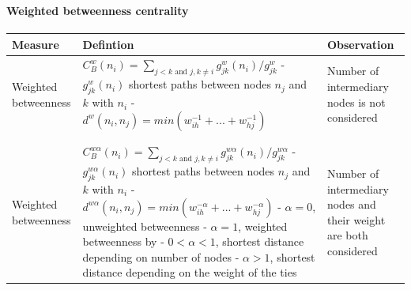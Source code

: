\documentclass[8pt]{beamer}
\begin{document}
\begin{frame}
\frametitle{\insertsection}
\framesubtitle{Weighted betweenness centrality	}
\scriptsize
\begin{table}
\begin{tabular}{p{2cm}p{6.5cm}p{2cm}}
\toprule
\textbf{Measure} & \textbf{Defintion} & \textbf{Observation}\\
\midrule
Weighted \newline betweenness\newline\cite{Brandes2008}&
$C_B^w(n_i) = \sum_{j<k \text{ and } j,k \neq i}g_{jk}^w(n_i)/g_{jk}^w$\newline
\newline
\newline
- $g_{jk}^w(n_i)$ shortest paths between nodes $n_j$ and $k$ with $n_i$ \newline
- $d^w(n_i, n_j) = min(w_{ih}^{-1}+ ... + w_{hj}^{-1})$&
Number of intermediary nodes is not considered\\
\\
\hline
\\
Weighted \newline betweenness\newline\cite{Opsahl2010} & 
$C_B^{w\alpha}(n_i) = \sum_{j<k \text{ and } j,k \neq i}g_{jk}^{w\alpha}(n_i)/g_{jk}^{w\alpha}$\newline
\newline
\newline
- $g_{jk}^{w\alpha}(n_i)$ shortest paths between nodes $n_j$ and $k$ with $n_i$ \newline
- $d^{w\alpha}(n_i, n_j) = min(w_{ih}^{-\alpha}+ ... + w_{hj}^{-\alpha})$\newline
- $\alpha=0$, unweighted betweenness\newline
- $\alpha=1$, weighted betweenness by \cite{Brandes2008}\newline
- $0<\alpha<1$, shortest distance depending on number of nodes\newline
- $\alpha>1$, shortest distance depending on the weight of the ties&
Number of intermediary nodes and their weight are both considered\\
\bottomrule
\end{tabular}
\end{table}

\end{frame}

\end{document}
